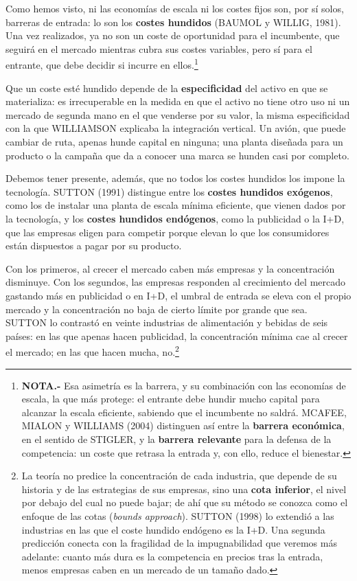 \documentclass[10pt,a4paper]{article}
\begin{document}
Como hemos visto, ni las economías de escala ni los costes fijos son, por sí solos, barreras de entrada: lo son los \textbf{costes hundidos} (BAUMOL y WILLIG, 1981). Una vez realizados, ya no son un coste de oportunidad para el incumbente, que seguirá en el mercado mientras cubra sus costes variables, pero sí para el entrante, que debe decidir si incurre en ellos.\footnote{%
  \textbf{NOTA.-} Esa asimetría es la barrera, y su combinación con las economías de escala, la que más protege: el entrante debe hundir mucho capital para alcanzar la escala eficiente, sabiendo que el incumbente no saldrá. MCAFEE, MIALON y WILLIAMS (2004) distinguen así entre la \textbf{barrera económica}, en el sentido de STIGLER, y la \textbf{barrera relevante} para la defensa de la competencia: un coste que retrasa la entrada y, con ello, reduce el bienestar.
} 

Que un coste esté hundido depende de la \textbf{especificidad} del activo en que se materializa: es irrecuperable en la medida en que el activo no tiene otro uso ni un mercado de segunda mano en el que venderse por su valor, la misma especificidad con la que WILLIAMSON explicaba la integración vertical. Un avión, que puede cambiar de ruta, apenas hunde capital en ninguna; una planta diseñada para un producto o la campaña que da a conocer una marca se hunden casi por completo.

Debemos tener presente, además, que no todos los costes hundidos los impone la tecnología. SUTTON (1991) distingue entre los \textbf{costes hundidos exógenos}, como los de instalar una planta de escala mínima eficiente, que vienen dados por la tecnología, y los \textbf{costes hundidos endógenos}, como la publicidad o la I+D, que las empresas eligen para competir porque elevan lo que los consumidores están dispuestos a pagar por su producto.

Con los primeros, al crecer el mercado caben más empresas y la concentración disminuye. Con los segundos, las empresas responden al crecimiento del mercado gastando más en publicidad o en I+D, el umbral de entrada se eleva con el propio mercado y la concentración no baja de cierto límite por grande que sea. SUTTON lo contrastó en veinte industrias de alimentación y bebidas de seis países: en las que apenas hacen publicidad, la concentración mínima cae al crecer el mercado; en las que hacen mucha, no.\footnote{%
  La teoría no predice la concentración de cada industria, que depende de su historia y de las estrategias de sus empresas, sino una \textbf{cota inferior}, el nivel por debajo del cual no puede bajar; de ahí que su método se conozca como el enfoque de las cotas (\textit{bounds approach}). SUTTON (1998) lo extendió a las industrias en las que el coste hundido endógeno es la I+D. Una segunda predicción conecta con la fragilidad de la impugnabilidad que veremos más adelante: cuanto más dura es la competencia en precios tras la entrada, menos empresas caben en un mercado de un tamaño dado.
}
\end{document}
